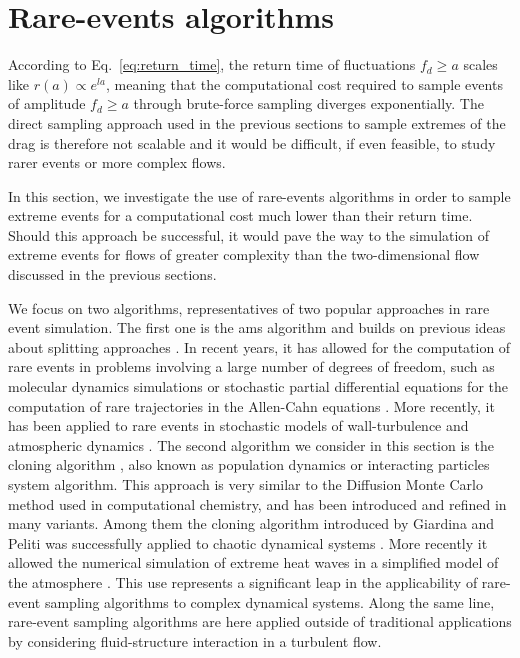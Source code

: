 \section{Rare-events algorithms}
\label{sec:rare_events_algorithms}

According to Eq.~\eqref{eq:return_time}, the return time of fluctuations $f_d \geq a$ scales like
$r(a)\propto e^{l a}$, meaning that the computational cost required to sample events of amplitude $f_d \geq a$ through brute-force sampling diverges exponentially.
The direct sampling approach used in the previous sections to sample extremes of the drag is therefore not scalable and it would be difficult, if even feasible, to study rarer events or more complex flows.

In this section, we investigate the use of rare-events algorithms in order to sample extreme events for a
computational cost much lower than their return time.
Should this approach be successful, it would pave the way to the simulation of extreme events for flows of
greater complexity than the two-dimensional flow discussed in the previous sections.

We focus on two algorithms, representatives of two popular approaches in rare event simulation.
The first one is the \acl{ams} algorithm \citep{cerou_adaptive_2007} and builds on previous ideas about splitting approaches \citep{KahnHarris1951,glasserman_multilevel_1999}.
In recent years, it has allowed for the computation of rare events in problems involving a large number of degrees of freedom, such as molecular dynamics simulations \citep{aristoff_adaptive_2015,teo_adaptive_2016} or stochastic partial differential equations for the computation of rare trajectories in the Allen-Cahn equations \citep{rolland_computing_2016}. More recently, it has been applied to rare events in stochastic models of wall-turbulence \citep{rolland_extremely_2018} and atmospheric dynamics \citep{bouchet2019rare}.
The second algorithm we consider in this section is the cloning algorithm \citep{giardina_direct_2006}, also known as population dynamics or interacting particles system algorithm.
This approach is very similar to the Diffusion Monte Carlo method used in computational chemistry, and has been introduced and refined in many variants.
Among them the cloning algorithm introduced by Giardina and Peliti \citep{giardina_direct_2006} was successfully applied to chaotic dynamical systems \citep{giardina_simulating_2011,Laffargue_2013}.
More recently it allowed the numerical simulation of extreme heat waves in a simplified model of the atmosphere \citep{ragone_computation_2018}.
This use represents a significant leap in the applicability of rare-event sampling algorithms to complex dynamical systems.
Along the same line, rare-event sampling algorithms are here applied outside of traditional applications by considering fluid-structure interaction in a turbulent flow.

